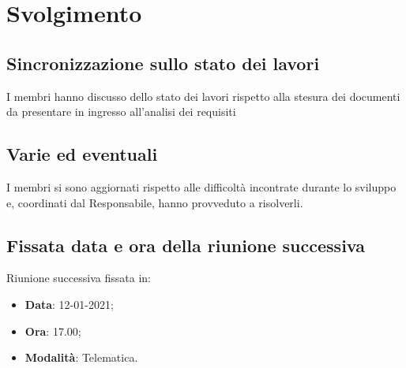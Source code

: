\documentclass[]{article}
\begin{document}
	\newpage

	\section{Svolgimento}
		\subsection{Sincronizzazione sullo stato dei lavori}
		I membri hanno discusso dello stato dei lavori rispetto alla stesura dei documenti da presentare in ingresso all'analisi dei requisiti\\
		\subsection{Varie ed eventuali}
		I membri si sono aggiornati rispetto alle difficoltà incontrate durante lo sviluppo e, coordinati dal Responsabile, hanno provveduto a risolverli.
		
		\subsection{Fissata data e ora della riunione successiva}
		Riunione successiva fissata in:
		\begin{itemize}
			\item \textbf{Data}: 12-01-2021;
			\item \textbf{Ora}: 17.00;
			\item \textbf{Modalità}: Telematica.
		\end{itemize}
	
\end{document}
